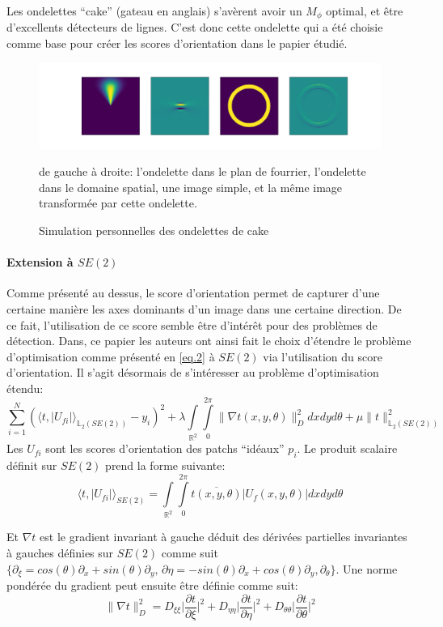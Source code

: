 \documentclass{article}
\begin{document}
Les ondelettes ``cake'' (gateau en anglais) s'avèrent avoir un $ M_{\phi} $ optimal, et
être d'excellents détecteurs de lignes. C'est donc cette ondelette qui a été choisie
comme base pour créer les scores d'orientation dans le papier étudié.
\begin{figure}[htpb]
\centering
\hspace*{-6em}
\includegraphics[scale=0.39]{plots/cake_wavelet.png}
\caption {Simulation personnelles des ondelettes de  cake}
de gauche à droite: l'ondelette dans le plan de fourrier, l'ondelette dans le domaine
spatial, une image simple, et la même image transformée par cette ondelette.
\end{figure}

\paragraph{Extension à $SE(2)$}
Comme présenté au dessus, le score d'orientation permet de capturer d'une certaine manière les axes dominants d'un image dans une certaine direction. De ce fait, 
l'utilisation de ce score semble être d'intérêt pour des problèmes de détection.
Dans, ce papier les auteurs ont ainsi fait le choix d'étendre le problème d'optimisation comme présenté en \ref{eq.2} à $SE(2)$ via 
l'utilisation du score d'orientation. Il s'agit désormais de s'intéresser au problème d'optimisation étendu:
\[
  \sum \limits_{i=1}^N (\langle t, |U_{fi}| \rangle_{{\mathbb{L}_2(SE(2))}} - y_i)^2 + \lambda \int \limits_{\mathbb{R}^2} \int \limits_{0}^{2\pi} \lVert 
  \nabla t(x, y, \theta)\rVert_{D}^2 dxdyd\theta + \mu \lVert t \rVert_{\mathbb{L}_2(SE(2))}^2
\]
Les $U_{fi}$ sont les scores d'orientation des patchs ``idéaux'' $p_i$.
Le produit scalaire définit sur $SE(2)$ prend la forme suivante:
\[
    \langle t, |U_{fi}| \rangle_{SE(2)} = 
    \int \limits_{\mathbb{R}^2} \int \limits_{0}^{2\pi} \overline{t(x, y, \theta)} \lvert U_f (x, y, \theta) \rvert dxdyd\theta
\]

Et $\nabla t$ est le gradient invariant à gauche déduit des dérivées partielles invariantes à gauches définies sur $SE(2)$
comme suit $\{\partial_{\xi} = cos(\theta)\partial_x + sin(\theta) \partial_y,\, \partial{\eta} = -sin(\theta) \partial_x + cos(\theta)
\partial_y, \partial_{\theta}\}$. Une norme pondérée du gradient peut ensuite être définie comme suit:
\[
    \lVert \nabla t \rVert_{D}^2 = D_{\xi \xi} \Big|\frac{\partial t}{\partial \xi} \Big|^2
    + D_{\eta \eta} \Big|\frac{\partial t}{\partial \eta}\Big|^2 + D_{\theta \theta} \Big|\frac{\partial t}{\partial \theta}\Big|^2
\]
\end{document}
